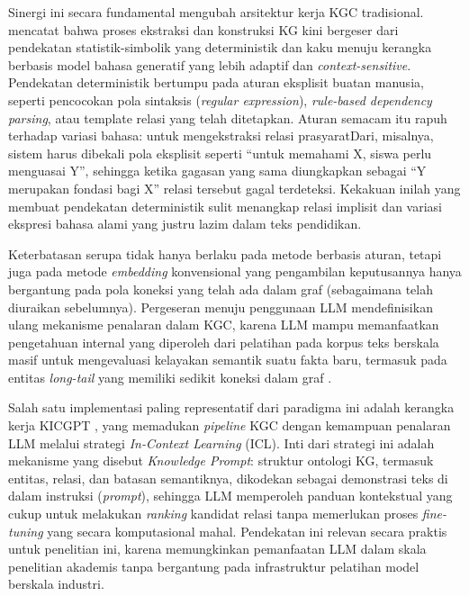 \documentclass[main]{subfiles}
\begin{document}
Sinergi ini secara fundamental mengubah arsitektur kerja KGC
tradisional. \textcite{bian_llm-empowered_2025} mencatat bahwa proses ekstraksi dan
konstruksi KG kini bergeser dari pendekatan statistik-simbolik yang
deterministik dan kaku menuju kerangka berbasis model bahasa generatif
yang lebih adaptif dan \textit{context-sensitive}. Pendekatan deterministik
bertumpu pada aturan eksplisit buatan manusia, seperti pencocokan pola
sintaksis (\textit{regular expression}), \textit{rule-based dependency
parsing}, atau template relasi yang telah ditetapkan. Aturan semacam itu
rapuh terhadap variasi bahasa: untuk mengekstraksi relasi prasyaratDari,
misalnya, sistem harus dibekali pola eksplisit seperti ``untuk memahami X,
siswa perlu menguasai Y'', sehingga ketika gagasan yang sama diungkapkan
sebagai ``Y merupakan fondasi bagi X'' relasi tersebut gagal terdeteksi.
Kekakuan inilah yang membuat pendekatan deterministik sulit menangkap
relasi implisit dan variasi ekspresi bahasa alami yang justru lazim dalam
teks pendidikan.

Keterbatasan serupa tidak hanya berlaku pada metode berbasis aturan,
tetapi juga pada metode \textit{embedding} konvensional yang pengambilan
keputusannya hanya bergantung pada pola koneksi yang telah ada dalam
graf (sebagaimana telah diuraikan sebelumnya). Pergeseran menuju
penggunaan LLM mendefinisikan ulang mekanisme penalaran dalam KGC,
karena LLM mampu memanfaatkan pengetahuan internal yang diperoleh dari
pelatihan pada korpus teks berskala masif untuk mengevaluasi kelayakan
semantik suatu fakta baru, termasuk pada entitas \textit{long-tail} yang
memiliki sedikit koneksi dalam graf \parencite{yao_exploring_2025, wei_kicgpt_2023}.

Salah satu implementasi paling representatif dari paradigma ini adalah
kerangka kerja KICGPT \parencite{wei_kicgpt_2023}, yang memadukan \textit{pipeline} KGC
dengan kemampuan penalaran LLM melalui strategi \textit{In-Context
Learning} (ICL). Inti dari strategi ini adalah mekanisme yang disebut
\textit{Knowledge Prompt}: struktur ontologi KG, termasuk entitas,
relasi, dan batasan semantiknya, dikodekan sebagai demonstrasi teks di
dalam instruksi (\textit{prompt}), sehingga LLM memperoleh panduan
kontekstual yang cukup untuk melakukan \textit{ranking} kandidat relasi
tanpa memerlukan proses \textit{fine-tuning} yang secara komputasional
mahal. Pendekatan ini relevan secara praktis untuk penelitian ini, karena
memungkinkan pemanfaatan LLM dalam skala penelitian akademis tanpa
bergantung pada infrastruktur pelatihan model berskala industri.
\end{document}
